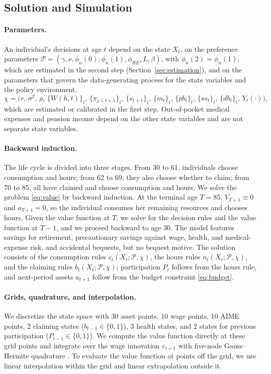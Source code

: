 \subsection{Solution and Simulation}\label{app:solution}

\paragraph{Parameters.} An individual's decisions at age $t$ depend on the state $X_t$, on the preference parameters $\mathcal{P}=(\gamma,\nu,\phi_n(0),\phi_n(1),\phi_{RE},L,\beta)$, with $\phi_n(2)=\phi_n(1)$, which are estimated in the second step (Section~\ref{sec:estimation}), and on the parameters that govern the data-generating process for the state variables and the policy environment,
\begin{equation*}
\chi=\Big(r,\,\sigma^2,\,\rho,\,\{W(h,t)\}_{t},\,\{\pi_{j,i,t+1}\}_{t},\,\{s_{t+1}\}_{t},\,\{m_t\}_{t},\,\{pb_t\}_{t},\,\{ss_t\}_{t},\,\{db_t\}_{t},\,Y_t(\cdot)\Big),
\end{equation*}
which are estimated or calibrated in the first step. Out-of-pocket medical expenses and pension income depend on the other state variables and are not separate state variables.

\paragraph{Backward induction.} The life cycle is divided into three stages. From 30 to 61, individuals choose consumption and hours; from 62 to 69, they also choose whether to claim; from 70 to 85, all have claimed and choose consumption and hours. We solve the problem \eqref{eq:value} by backward induction. At the terminal age $T=85$, $V_{T+1}\equiv0$ and $a_{T+1}=0$, so the individual consumes her remaining resources and chooses hours. Given the value function at $T$, we solve for the decision rules and the value function at $T-1$, and we proceed backward to age 30. The model features savings for retirement, precautionary savings against wage, health, and medical-expense risk, and accidental bequests, but no bequest motive. The solution consists of the consumption rules $c_t(X_t;\mathcal{P},\chi)$, the hours rules $n_t(X_t;\mathcal{P},\chi)$, and the claiming rules $b_t(X_t;\mathcal{P},\chi)$; participation $P_t$ follows from the hours rule, and next-period assets $a_{t+1}$ follow from the budget constraint \eqref{eq:budget}.

\paragraph{Grids, quadrature, and interpolation.} We discretize the state space with 30 asset points, 10 wage points, 10 AIME points, 2 claiming states ($b_{t-1}\in\{0,1\}$), 3 health states, and 2 states for previous participation ($P_{t-1}\in\{0,1\}$). We compute the value function directly at these grid points and integrate over the wage innovation $\varepsilon_{t+1}$ with five-node Gauss--Hermite quadrature \citep{Judd1998}. To evaluate the value function at points off the grid, we use linear interpolation within the grid and linear extrapolation outside it.

